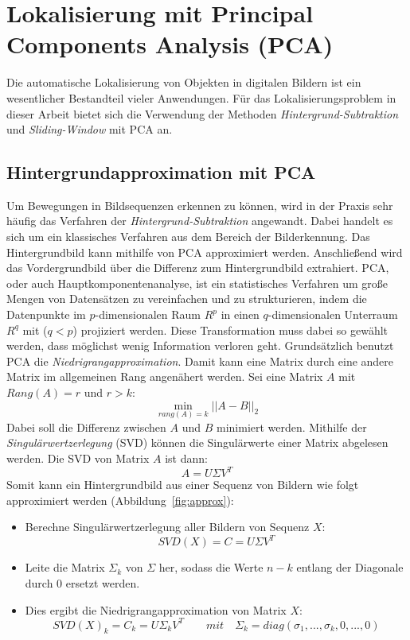 \section{ Lokalisierung mit Principal Components Analysis (PCA)} \label{sec:PCA}
Die automatische Lokalisierung von Objekten in digitalen Bildern ist ein wesentlicher Bestandteil vieler Anwendungen. 
Für das Lokalisierungsproblem in dieser Arbeit bietet sich die Verwendung der Methoden \textit{Hintergrund-Subtraktion} und \textit{Sliding-Window} mit PCA an.

\subsection{Hintergrundapproximation mit PCA}
Um Bewegungen in Bildsequenzen erkennen zu können, wird in der Praxis sehr häufig das Verfahren der \textit{Hintergrund-Subtraktion} angewandt. Dabei handelt es sich um ein klassisches Verfahren aus dem Bereich der Bilderkennung. Das Hintergrundbild kann mithilfe von PCA approximiert werden. Anschließend wird das Vordergrundbild über die Differenz zum Hintergrundbild extrahiert. PCA, oder auch Hauptkomponentenanalyse, ist ein statistisches Verfahren um große Mengen von Datensätzen zu vereinfachen und zu strukturieren, indem die Datenpunkte im $p$-dimensionalen Raum $R^p$ in einen $q$-dimensionalen Unterraum ${R} ^{q}$ mit ($q<p$) projiziert werden. Diese Transformation muss dabei so gewählt werden, dass möglichst wenig Information verloren geht.
Grundsätzlich benutzt PCA die \textit{Niedrigrangapproximation}. Damit kann eine Matrix durch eine andere Matrix im allgemeinen Rang angenähert werden. Sei eine Matrix $A$ mit $Rang(A) = r$ und $r > k$:
\begin{equation}
\min_{rang(A)=k}||A-B||_2 
\end{equation}
Dabei soll die Differenz zwischen $A$ und $B$ minimiert werden. Mithilfe der \textit{Singulärwertzerlegung} (SVD) können die Singulärwerte einer Matrix abgelesen werden. Die SVD von Matrix $A$ ist dann:
\begin{equation}
A = U \Sigma V^T
\end{equation}
Somit kann ein Hintergrundbild aus einer Sequenz von Bildern wie folgt approximiert werden (Abbildung~\ref{fig:approx}):
\begin{itemize}
\item{Berechne Singulärwertzerlegung aller Bildern von Sequenz $X$:}
\begin{equation}
SVD(X)= C = U \Sigma V^T
\end{equation}
\item{Leite die Matrix ${\Sigma_k}$ von ${\Sigma}$ her, sodass die Werte ${n - k}$  entlang der Diagonale durch 0 ersetzt werden.}
\item{Dies ergibt die Niedrigrangapproximation von Matrix $X$:}
\begin{equation}
SVD(X)_k=C_k = U\Sigma_kV^T \quad\quad mit  \quad  \Sigma_k = diag(\sigma_1, ..., \sigma_k,0,...,0)
\end{equation}
\end{itemize}

